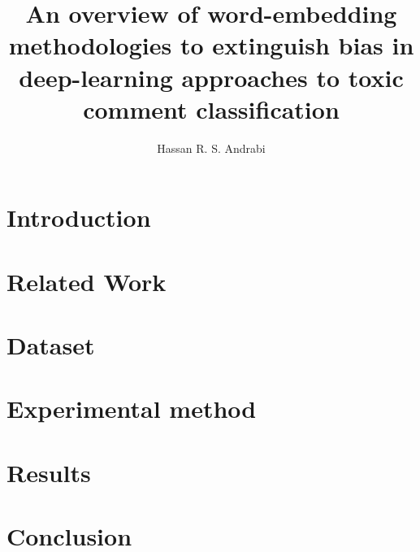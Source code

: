 \documentclass{article}
\title{An overview of word-embedding methodologies to extinguish bias in deep-learning approaches to toxic comment classification}
\author{Hassan R. S. Andrabi}
\date{}
\begin{document}
\maketitle

\begin{abstract}

\end{abstract}

\section{Introduction}\label{sec:introduction}


\section{Related Work}\label{sec:related-work}


\section{Dataset}\label{sec:dataset}


\section{Experimental method}\label{sec:experimental-method}


\section{Results}\label{sec:results}


\section{Conclusion}\label{sec:results}


\newpage



\end{document}
